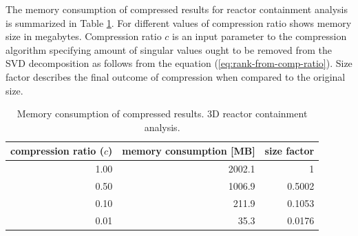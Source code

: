 The memory consumption of compressed results for reactor containment analysis is summarized in Table \ref{tab:mem-consum}. For different values of compression ratio shows memory size in megabytes. Compression ratio $c$ is an input parameter to the compression algorithm specifying amount of singular values ought to be removed from the SVD decomposition as follows from the equation (\ref{eq:rank-from-comp-ratio}). Size factor describes the final outcome of compression when compared to the original size.

\begin{table}[H]
\centering
\caption{Memory consumption of compressed results. 3D reactor containment analysis.}
    \begin{tabular}{|r | r | r|}
    \hline
    compression ratio ($c$) & memory consumption [MB] & size factor \\ \hline
    1.00 & 2002.1 & 1 \\
    0.50 & 1006.9 & 0.5002 \\
    0.10& 211.9 & 0.1053 \\
    0.01 & 35.3 & 0.0176 \\ \hline
    \end{tabular}
	\label{tab:mem-consum}
\end{table}
